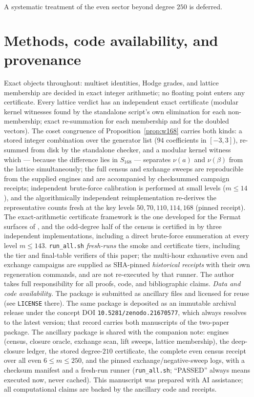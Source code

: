 \documentclass[11pt]{amsart}
\theoremstyle{remark}
\begin{document}
A systematic treatment of the even sector beyond degree $250$ is deferred.

\section{Methods, code availability, and provenance}\label{sec:methods}
Exact objects throughout: multiset identities, Hodge grades, and lattice membership are decided
in exact integer arithmetic; no floating point enters any certificate. Every lattice verdict has an
independent exact certificate (modular kernel witnesses found by the standalone script's own
elimination for each non-membership; exact re-summation for each membership and for the doubled
vectors). The coset congruence of Proposition~\ref{prop:w168} carries both kinds: a stored
integer combination over the generator list ($94$ coefficients in $[-3,3]$), re-summed from disk
by the standalone checker, and a modular kernel witness which --- because the difference lies in
$S_{168}$ --- separates $\nu(a)$ and $\nu(\beta)$ from the lattice simultaneously; the full census and exchange sweeps are reproducible from the supplied engines and are
accompanied by checksummed campaign receipts; independent brute-force calibration is performed
at small levels ($m\le14$), and the algorithmically independent reimplementation re-derives the
representative counts fresh at the key levels $50,70,110,114,168$ (pinned receipt). The
exact-arithmetic certificate framework is the one developed for the Fermat surfaces of
\cite{P1}, and the odd-degree half of the census is certified in \cite{BN} by three
independent implementations, including a direct brute-force enumeration at every level
$m\le143$. \texttt{run\_all.sh} \emph{fresh-runs} the smoke and certificate tiers, including the tier and
final-table verifiers of this paper; the multi-hour exhaustive even and exchange campaigns are
supplied as SHA-pinned \emph{historical receipts} with their own regeneration commands, and are
not re-executed by that runner. The author
takes full responsibility for all proofs, code, and bibliographic claims. \emph{Data and code
availability.} The package is submitted as ancillary files and licensed for reuse (see
\texttt{LICENSE} there). The same package is deposited as an immutable archival release under
the concept DOI \texttt{10.5281/zenodo.21670577}, which always resolves to the latest version;
that record carries both manuscripts of the two-paper package. The ancillary package is shared with the companion note: engines (census, closure
oracle, exchange scan, lift sweeps, lattice membership), the deep-closure ledger, the stored
degree-$210$ certificate, the complete even census receipt over all even $6\le m\le250$, and the
pinned exchange/negative-sweep logs, with a checksum manifest and a fresh-run runner
(\texttt{run\_all.sh}; ``PASSED'' always means executed now, never cached). This manuscript was
prepared with AI assistance; all computational claims are backed by the ancillary code and
receipts.
\end{document}
